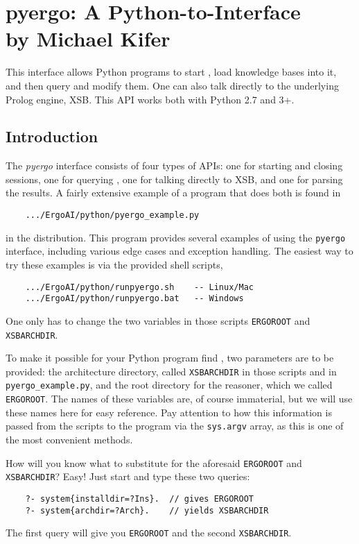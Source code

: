 \chapter[Python-to-\ERGO Interface]
{pyergo: A Python-to-\ERGO Interface \\ 
  {\Large by Michael Kifer}}

This interface allows Python programs to start \ERGO, load knowledge bases
into it, and then query and modify them.  One can also talk directly to the
underlying Prolog engine, XSB.
This API works both with Python 2.7 and 3+.

\section{Introduction}

The \emph{pyergo} interface consists of four types of APIs: one for
starting and closing \ERGO sessions, one for querying \ERGO,
one for talking directly to XSB, and one for parsing the results.
A fairly extensive example of a program that does both is found in
\begin{verbatim}
    .../ErgoAI/python/pyergo_example.py
\end{verbatim}
in the \ERGO distribution. This program provides several examples of using
the \texttt{pyergo} interface, including various edge cases and exception
handling. 
The easiest way to try these examples is via the provided shell scripts,
\begin{verbatim}
    .../ErgoAI/python/runpyergo.sh    -- Linux/Mac
    .../ErgoAI/python/runpyergo.bat   -- Windows
\end{verbatim}
One only has to change the two variables in those scripts \texttt{ERGOROOT}
and \texttt{XSBARCHDIR}.

To make it possible for your Python program
find \ERGO, two parameters are to be provided: the architecture directory,
called \texttt{XSBARCHDIR} in those scripts and in
\texttt{pyergo\_example.py}, and the root directory for the \ERGO reasoner,
which we called \texttt{ERGOROOT}. The names of these variables are, of
course immaterial, but we will use these names here for easy reference.
Pay attention to how this information is passed from the scripts to the
program via the \texttt{sys.argv}  array, as this is one of the most
convenient methods.

How will you know what to substitute for the aforesaid \texttt{ERGOROOT}
and \texttt{XSBARCHDIR}? Easy! Just start \ERGO and type these two
queries:
\begin{verbatim}
    ?- system{installdir=?Ins}.  // gives ERGOROOT
    ?- system{archdir=?Arch}.    // yields XSBARCHDIR
\end{verbatim}
The first query will give you \texttt{ERGOROOT} and the second
\texttt{XSBARCHDIR}.


